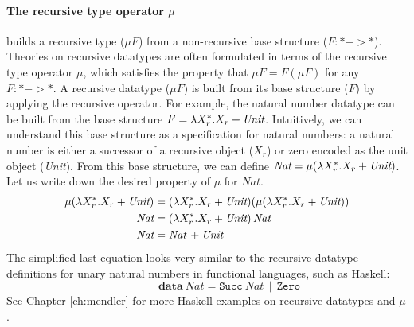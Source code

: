 \paragraph{The recursive type operator $\mu$} builds a recursive type
($\mu F$) from a non-recursive base structure ($F:* -> *$).
Theories on recursive datatypes are often formulated in terms of
the recursive type operator $\mu$, which satisfies the property
that $\mu F = F (\mu F)$ for any $F: * -> *$. A recursive datatype ($\mu F$)
is built from its base structure ($F$) by applying the recursive operator.
For example, the natural number datatype can be built from the base structure
$F = \lambda X_r^{*}.X_r + \textit{Unit}$. Intuitively, we can understand this
base structure as a specification for natural numbers: a natural number is
either a successor of a recursive object ($X_r$)
or zero encoded as the unit object (\textit{Unit}).
From this base structure, we can define
$\textit{Nat} = \mu(\lambda X_r^{*}.X_r + \textit{Unit})$.
Let us write down the desired property of $\mu$ for $\textit{Nat}$.
\begin{align*}
\mu(\lambda X_r^{*}.X_r + \textit{Unit}) &=
(\lambda X_r^{*}.X_r + \textit{Unit})(\mu(\lambda X_r^{*}.X_r + \textit{Unit})) \\
\textit{Nat} &= (\lambda X_r^{*}.X_r + \textit{Unit})\,\textit{Nat} \\
\textit{Nat} &= \textit{Nat}\, + \textit{Unit}
\end{align*}
The simplified last equation looks very similar to
the recursive datatype definitions for unary natural numbers
in functional languages, such as Haskell: \[ \qquad\qquad
\textbf{data}~\textit{Nat} = \texttt{Succ}~\textit{Nat}\,\mid\,\texttt{Zero} \]
See Chapter \ref{ch:mendler}
for more Haskell examples on recursive datatypes and $\mu$.

